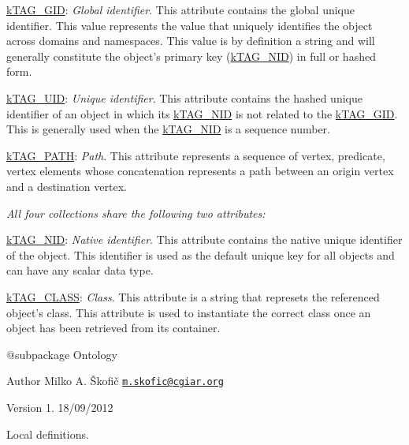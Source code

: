 {\begin{DoxyItemize}
\begin{DoxyItemize}
\item {\ttfamily \hyperlink{}{k\-T\-A\-G\-\_\-\-G\-I\-D}}\-: {\itshape Global identifier}. This attribute contains the global unique identifier. This value represents the value that uniquely identifies the object across domains and namespaces. This value is by definition a string and will generally constitute the object's primary key (\hyperlink{}{k\-T\-A\-G\-\_\-\-N\-I\-D}) in full or hashed form. 
\item {\ttfamily \hyperlink{}{k\-T\-A\-G\-\_\-\-U\-I\-D}}\-: {\itshape Unique identifier}. This attribute contains the hashed unique identifier of an object in which its \hyperlink{}{k\-T\-A\-G\-\_\-\-N\-I\-D} is not related to the \hyperlink{}{k\-T\-A\-G\-\_\-\-G\-I\-D}. This is generally used when the \hyperlink{}{k\-T\-A\-G\-\_\-\-N\-I\-D} is a sequence number. 
\item {\ttfamily \hyperlink{}{k\-T\-A\-G\-\_\-\-P\-A\-T\-H}}\-: {\itshape Path}. This attribute represents a sequence of {\ttfamily vertex}, {\ttfamily predicate}, {\ttfamily vertex} elements whose concatenation represents a path between an origin vertex and a destination vertex. 
\end{DoxyItemize}
\end{DoxyItemize}}

{\itshape All four collections share the following two attributes\-:}

{\itshape 
\begin{DoxyItemize}
\item {\ttfamily \hyperlink{}{k\-T\-A\-G\-\_\-\-N\-I\-D}}\-: {\itshape Native identifier}. This attribute contains the native unique identifier of the object. This identifier is used as the default unique key for all objects and can have any scalar data type. 
\item {\ttfamily \hyperlink{}{k\-T\-A\-G\-\_\-\-C\-L\-A\-S\-S}}\-: {\itshape Class}. This attribute is a string that represets the referenced object's class. This attribute is used to instantiate the correct class once an object has been retrieved from its container. 
\end{DoxyItemize}}

{\itshape \begin{DoxyVerb} @subpackage        Ontology
\end{DoxyVerb}
}

{\itshape \begin{DoxyAuthor}{Author}
Milko A. Škofič \href{mailto:m.skofic@cgiar.org}{\tt m.\-skofic@cgiar.\-org} 
\end{DoxyAuthor}
\begin{DoxyVersion}{Version}
1. 18/09/2012
\end{DoxyVersion}
Local definitions.}

